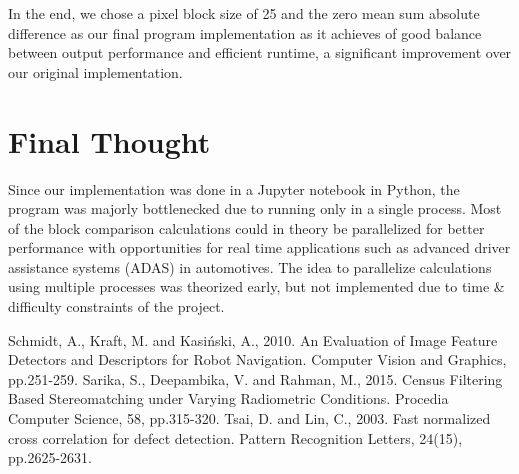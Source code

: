 \documentclass[conference]{IEEEtran}
\begin{document}
In the end, we chose a pixel block size of 25 and the zero mean sum absolute difference as our final program implementation as it achieves of good balance between output performance and efficient runtime, a significant improvement over our original implementation.

\section{Final Thought}

Since our implementation was done in a Jupyter notebook in Python, the program was majorly bottlenecked due to running only in a single process. Most of the block comparison calculations could in theory be parallelized for better performance with opportunities for real time applications such as advanced driver assistance systems (ADAS) in automotives. The idea to parallelize calculations using multiple processes was theorized early, but not implemented due to time \& difficulty constraints of the project.

\newpage
\begin{thebibliography}{00}
 Schmidt, A., Kraft, M. and Kasiński, A., 2010. An Evaluation of Image Feature Detectors and Descriptors for Robot Navigation. Computer Vision and Graphics, pp.251-259.
 Sarika, S., Deepambika, V. and Rahman, M., 2015. Census Filtering Based Stereomatching under Varying Radiometric Conditions. Procedia Computer Science, 58, pp.315-320.
 Tsai, D. and Lin, C., 2003. Fast normalized cross correlation for defect detection. Pattern Recognition Letters, 24(15), pp.2625-2631.
\end{thebibliography}
\end{document}
